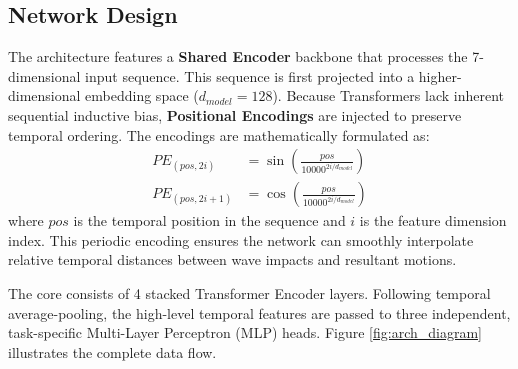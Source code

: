 \subsection{Network Design}
The architecture features a \textbf{Shared Encoder} backbone that processes the 7-dimensional input sequence. This sequence is first projected into a higher-dimensional embedding space ($d_{model} = 128$). Because Transformers lack inherent sequential inductive bias, \textbf{Positional Encodings} are injected to preserve temporal ordering. The encodings are mathematically formulated as:
\begin{align}
    PE_{(pos, 2i)} &= \sin\left(\frac{pos}{10000^{2i/d_{model}}}\right) \\
    PE_{(pos, 2i+1)} &= \cos\left(\frac{pos}{10000^{2i/d_{model}}}\right)
\end{align}
where $pos$ is the temporal position in the sequence and $i$ is the feature dimension index. This periodic encoding ensures the network can smoothly interpolate relative temporal distances between wave impacts and resultant motions.

The core consists of 4 stacked Transformer Encoder layers. Following temporal average-pooling, the high-level temporal features are passed to three independent, task-specific Multi-Layer Perceptron (MLP) heads. Figure \ref{fig:arch_diagram} illustrates the complete data flow.

